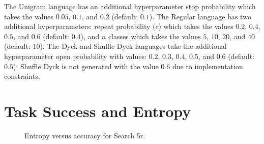 The Unigram language has an additional hyperparameter stop probability which takes the values $0.05$, $0.1$, and $0.2$ (default: $0.1$).
The Regular language has two additional hyperparameters: repeat probability ($c$) which takes the values $0.2$, $0.4$, $0.5$, and $0.6$ (default: $0.4$), and $n$ classes which takes the values $5$, $10$, $20$, and $40$ (default: $10$).
The Dyck and Shuffle Dyck languages take the additional hyperparameter open probability with values: $0.2$, $0.3$, $0.4$, $0.5$, and $0.6$ (default: $0.5$); Shuffle Dyck is not generated with the value $0.6$ due to implementation constraints.


\iffalse
def dyck(
    open_prob: float = 0.4,
    n_tokens: int = 20_000_000,
    vocab_size: int = 30_000 - 10,
    zm_alpha: float = 1,
    zm_beta: float = 2.7,
def shuffle_dyck(
    open_prob: float = 0.4,
    n_tokens: int = 20_000_000,
    vocab_size: int = 30_000 - 10,
    # https://www.ncbi.nlm.nih.gov/pmc/articles/PMC4176592/
    zm_alpha: float = 1,
    zm_beta: float = 2.7,
def concat(
    repeat_prob: float = 0.5,
    n_classes: int = 10,
    n_tokens: int = 20_000_000,
    vocab_size: int = 30_000 - 10,
    # https://www.ncbi.nlm.nih.gov/pmc/articles/PMC4176592/
    zm_alpha: float = 1,
    zm_beta: float = 2.7,
def unigram(
    stop_prob: float = 0.1,
    n_tokens: int = 20_000_000,
    vocab_size: int = 30_000 - 10,
    zm_alpha: float = 1,
    zm_beta: float = 2.7,

dyck
    # n_tokens (5): 1k, 10k, 100k, 1m, 5m, (15M)
    # vocab_size (5): 10, 100, 1k, 5k, 10k, (30k)
    # open_prob (5): 0.2, 0.3, (0.4), 0.45, 0.5, 0.6
    # zm_alpha (5): 0, 0.25, 0.5, (1), 2, 4
      if which == "shuffle-dyck" and open_prob > 0.5:

def sweep_concat() -> Iterator:
    # n_tokens (5): 1k, 10k, 100k, 1m, 5m, (15M)
    # vocab_size (5): 10, 100, 1k, 5k, 10k, (30k)
      not 10
    # zm_alpha (5): 0, 0.25, 0.5, (1), 2, 4
    # n_classes (5): 5, 10, 20, 40
    # repeat_prob (5): 0.2, (0.4), 0.5,  0.6

def sweep_unigram() -> Iterator:
    for vocab_size in [100, 1000, 5000, 10000]:
    for stop_prob in [0.05, 0.2]:
    for zm_alpha in [0, 0.25, 0.5, 2, 4]:
  \fi


\section{Task Success and Entropy}
\unskip\label{hpo:sec:ent-vs-acc}
\begin{figure}
  \centering
  \caption{Entropy versus accuracy for Search 5r.}
  \unskip\label{hpo:fig:ent-vs-acc}
\end{figure}

